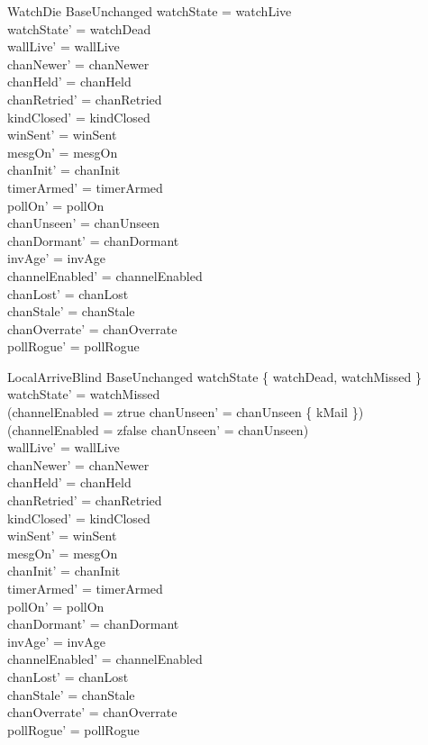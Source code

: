 \documentclass[a4paper,10pt,fleqn]{article}
\begin{document}
\begin{schema}{WatchDie}
  BaseUnchanged
  \where
  watchState = watchLive \\
  watchState' = watchDead \\
  wallLive' = wallLive \\
  chanNewer' = chanNewer \\
  chanHeld' = chanHeld \\
  chanRetried' = chanRetried \\
  kindClosed' = kindClosed \\
  winSent' = winSent \\
  mesgOn' = mesgOn \\
  chanInit' = chanInit \\
  timerArmed' = timerArmed \\
  pollOn' = pollOn \\
  chanUnseen' = chanUnseen \\
  chanDormant' = chanDormant \\
  invAge' = invAge \\
  channelEnabled' = channelEnabled \\
  chanLost' = chanLost \\
  chanStale' = chanStale \\
  chanOverrate' = chanOverrate \\
  pollRogue' = pollRogue
\end{schema}

\begin{schema}{LocalArriveBlind}
  BaseUnchanged
  \where
  watchState \in \{ watchDead, watchMissed \} \\
  watchState' = watchMissed \\
  (channelEnabled = ztrue \implies chanUnseen' = chanUnseen \cup \{ kMail \}) \\
  (channelEnabled = zfalse \implies chanUnseen' = chanUnseen) \\
  wallLive' = wallLive \\
  chanNewer' = chanNewer \\
  chanHeld' = chanHeld \\
  chanRetried' = chanRetried \\
  kindClosed' = kindClosed \\
  winSent' = winSent \\
  mesgOn' = mesgOn \\
  chanInit' = chanInit \\
  timerArmed' = timerArmed \\
  pollOn' = pollOn \\
  chanDormant' = chanDormant \\
  invAge' = invAge \\
  channelEnabled' = channelEnabled \\
  chanLost' = chanLost \\
  chanStale' = chanStale \\
  chanOverrate' = chanOverrate \\
  pollRogue' = pollRogue
\end{schema}
\end{document}
